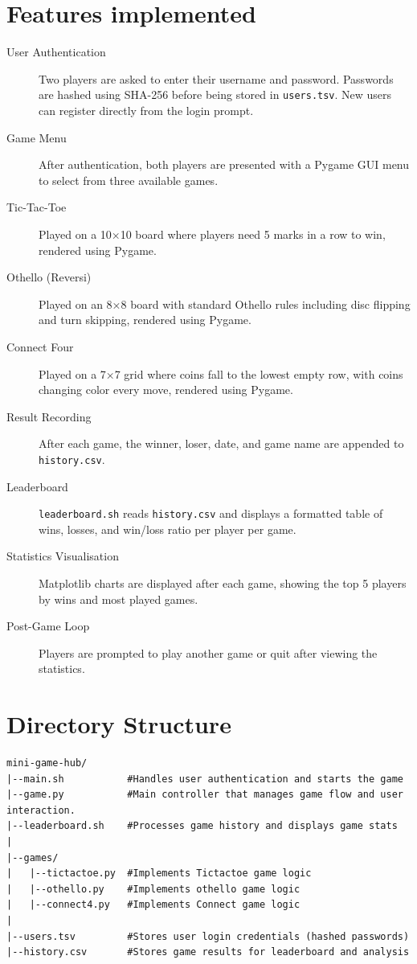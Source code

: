 \documentclass[12pt]{article}
\begin{document}
\section{Features implemented}
\begin{description}
    \item[User Authentication] Two players are asked to
 enter their username and password. Passwords are hashed using 
    SHA-256 before being stored in \texttt{users.tsv}. New users can 
    register directly from the login prompt.

    \item[Game Menu] After authentication, both players are 
    presented with a Pygame GUI menu to select from three available games.

    \item[Tic-Tac-Toe] Played on a 10×10 board where players 
    need 5 marks in a row to win, rendered using Pygame.

    \item[Othello (Reversi)] Played on an 8×8 board with 
    standard Othello rules including disc flipping and turn skipping, 
    rendered using Pygame.

    \item[Connect Four] Played on a 7×7 grid where coins 
    fall to the lowest empty row, with coins changing color every 
    move, rendered using Pygame.

    \item[Result Recording] After each game, the winner, 
    loser, date, and game name are appended to \texttt{history.csv}.

    \item[Leaderboard] \texttt{leaderboard.sh} reads 
    \texttt{history.csv} and displays a formatted table of wins, 
    losses, and win/loss ratio per player per game.

    \item[Statistics Visualisation] Matplotlib charts are 
    displayed after each game, showing the top 5 players by wins and 
    most played games.

    \item[Post-Game Loop] Players are prompted to play 
    another game or quit after viewing the statistics.
\end{description}

\section{Directory Structure}
\begin{verbatim}
mini-game-hub/
|--main.sh           #Handles user authentication and starts the game
|--game.py           #Main controller that manages game flow and user interaction.
|--leaderboard.sh    #Processes game history and displays game stats
|
|--games/
|   |--tictactoe.py  #Implements Tictactoe game logic
|   |--othello.py    #Implements othello game logic
|   |--connect4.py   #Implements Connect game logic
|       
|--users.tsv         #Stores user login credentials (hashed passwords)
|--history.csv       #Stores game results for leaderboard and analysis
\end{verbatim}
\end{document}
